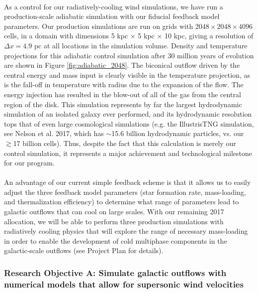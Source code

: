 \documentclass[11pt,letterpaper,english]{article}
\begin{document}
~\\
As a control for our radiatively-cooling wind simulations, we have run a production-scale adiabatic simulation with our fiducial feedback model parameters. Our production simulations are run on grids with $2048\times2048\times4096$ cells, in a domain with dimensions 5 kpc $\times$ 5 kpc $\times$ 10 kpc, giving a resolution of $\Delta x=4.9$ pc at all locations in the simulation volume. Density and temperature projections for this adiabatic control simulation after 30 million years of evolution are shown in Figure \ref{fig:adiabatic_2048}. The biconical outflow driven by the central energy and mass input is clearly visible in the temperature projection, as is the fall-off in temperature with radius due to the expansion of the flow. The energy injection has resulted in the blow-out of all of the gas from the central region of the disk. This simulation represents by far the largest hydrodynamic simulation of an isolated galaxy ever performed, and its hydrodynamic resolution tops that of even large cosmological simulations (e.g. the IllustrisTNG simulation, see Nelson et al. 2017, which has $\sim$15.6 billion hydrodynamic particles, vs. our $\gtrsim$17 billion cells). Thus, despite the fact that this calculation is merely our control simulation, it represents a major achievement and technological milestone for our program.
~\\~\\
An advantage of our current simple feedback scheme is that it allows us to easily adjust the three feedback model parameters (star formation rate, mass-loading, and thermalization efficiency) to determine what range of parameters lead to galactic outflows that can cool on large scales. With our remaining 2017 allocation, we will be able to perform three production simulations with radiatively cooling physics that will explore the range of necessary mass-loading in order to enable the development of cold multiphase components in the
galactic-scale outflows (see Project Plan for details).

\subsubsection{Research Objective A: Simulate galactic outflows with numerical models that allow for supersonic wind velocities}
\end{document}
